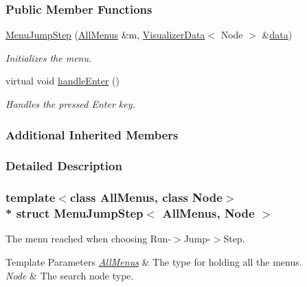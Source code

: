 \subsubsection*{Public Member Functions}
\begin{DoxyCompactItemize}
\item 
\hyperlink{structMenuJumpStep_a02c669010196ff9f4ccf2c904d0089f4}{Menu\+Jump\+Step} (\hyperlink{structAllMenus}{All\+Menus} \&m, \hyperlink{structVisualizerData}{Visualizer\+Data}$<$ Node $>$ \&\hyperlink{structMenuBase_a819aaaa06ede3bffbb12c1390657ef64}{data})
\begin{DoxyCompactList}\small\item\em Initializes the menu. \end{DoxyCompactList}\item 
virtual void \hyperlink{structMenuJumpStep_a941d4ebc524b9b6d0d06e27416e79ed9}{handle\+Enter} ()\hypertarget{structMenuJumpStep_a941d4ebc524b9b6d0d06e27416e79ed9}{}\label{structMenuJumpStep_a941d4ebc524b9b6d0d06e27416e79ed9}

\begin{DoxyCompactList}\small\item\em Handles the pressed Enter key. \end{DoxyCompactList}\end{DoxyCompactItemize}
\subsubsection*{Additional Inherited Members}


\subsubsection{Detailed Description}
\subsubsection*{template$<$class All\+Menus, class Node$>$\\*
struct Menu\+Jump\+Step$<$ All\+Menus, Node $>$}

The menu reached when choosing Run-\/$>$Jump-\/$>$Step. 


\begin{DoxyTemplParams}{Template Parameters}
{\em \hyperlink{structAllMenus}{All\+Menus}} & The type for holding all the menus. \\
\hline
{\em Node} & The search node type. \\
\hline
\end{DoxyTemplParams}


